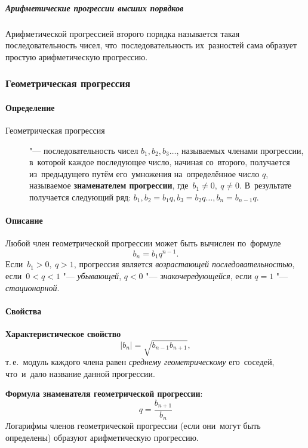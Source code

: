\documentclass[]{scrartcl}
\begin{document}
\subparagraph{Арифметические прогрессии высших порядков}
Арифметической прогрессией второго порядка называется такая последовательность чисел, что~последовательность их~разностей сама образует простую арифметическую прогрессию.

\subsubsection{Геометрическая прогрессия}
\paragraph{Определение}
\begin{description}
	\item[Геометрическая прогрессия] "--- последовательность чисел ${\textstyle b_{1}, b_2, b_{3}\ldots}$, называемых членами прогрессии, в~которой каждое последующее число, начиная со~второго, получается из~предыдущего путём его~умножения на~определённое число ${\textstyle q}$, называемое \textbf{знаменателем прогрессии}, где~${\textstyle b_{1}\neq 0,\ q\neq 0}$. В~результате получается следующий ряд: ${\textstyle b_{1}, b_2 = b_{1}q, b_{3}=b_{2}q \ldots, b_n = b_{n−1}q}$. 
\end{description}
\paragraph{Описание}
Любой член геометрической прогрессии может быть вычислен по~формуле
\begin{equation}\label{eq:geometric-progression-01}
b_{n}=b_{1}q^{n-1}.
\end{equation}
Если~${\textstyle b_{1}>0,\ q>1}$, прогрессия является \emph{возрастающей последовательностью}, если~${\textstyle 0<q<1}$ "--- \emph{убывающей}, ${\textstyle q<0}$ "--- \emph{знакочередующейся}, если ${\textstyle q=1}$ "--- \emph{стационарной}. 
\paragraph{Свойства}
\textbf{Характеристическое свойство}\begin{equation}\label{eq:geometric-progression-02}
|b_{n}|={\sqrt{b_{n-1}b_{n+1}}},
\end{equation}
т.\,е.~модуль каждого члена равен \emph{среднему геометрическому} его~соседей, что~и~дало название данной прогрессии.

\textbf{Формула знаменателя геометрической прогрессии}:
\begin{equation}\label{eq:geometric-progression-03}
q={\frac{b_{n+1}}{b_{n}}} 
\end{equation}
Логарифмы членов геометрической прогрессии (если они~могут быть определены) образуют арифметическую прогрессию.
\end{document}
